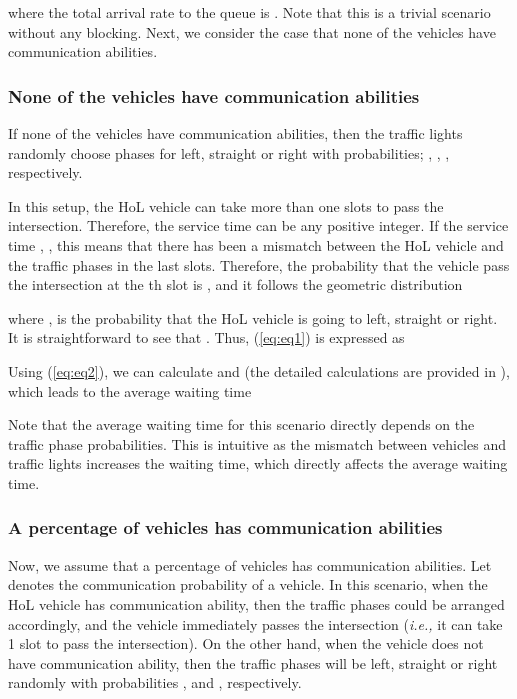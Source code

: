 \documentclass[conference]{IEEEtran}
\newcommand{\ie}{{\em i.e., }}
\begin{document}
 where the total arrival rate to the queue is . Note that this is a trivial scenario without any blocking. Next, we consider the case that none of the vehicles have communication abilities.

\subsubsection{None of the vehicles have communication abilities}\label{nocarscantellmodel1}
If none of the vehicles have communication abilities, then the traffic lights randomly choose phases for left, straight or right with probabilities; , , , respectively.

In this setup, the HoL vehicle can take more than one slots to pass the intersection. Therefore, the service time  can be any positive integer. If the service time , , this means that there has been a mismatch between the HoL vehicle and the traffic phases in the last  slots. Therefore, the probability that the vehicle pass the intersection at the th slot is , and it follows the geometric distribution

where ,  is the probability that the HoL vehicle is going to left, straight or right. It is straightforward to see that . Thus, (\ref{eq:eq1}) is expressed as

Using (\ref{eq:eq2}), we can calculate  and  (the detailed calculations are provided in \cite{this_tech}), which leads to the average waiting time



Note that the average waiting time for this scenario directly depends on the traffic phase probabilities. This is intuitive as the mismatch between vehicles and traffic lights increases the waiting time, which directly affects the average waiting time.



\subsubsection{A percentage of vehicles has communication abilities}\label{somecarcantellmodel1}
Now, we assume that a percentage of vehicles has communication abilities. Let  denotes the communication probability of a vehicle. In this scenario, when the HoL vehicle has communication ability, then the traffic phases could be arranged accordingly, and the vehicle immediately passes the intersection (\ie it can take 1 slot to pass the intersection). On the other hand, when the vehicle does not have communication ability, then the traffic phases will be left, straight or right randomly with probabilities ,  and , respectively.
\end{document}
